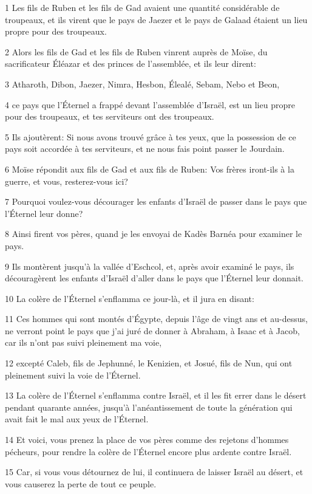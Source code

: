 \par 1 Les fils de Ruben et les fils de Gad avaient une quantité considérable de troupeaux, et ils virent que le pays de Jaezer et le pays de Galaad étaient un lieu propre pour des troupeaux.
\par 2 Alors les fils de Gad et les fils de Ruben vinrent auprès de Moïse, du sacrificateur Éléazar et des princes de l'assemblée, et ils leur dirent:
\par 3 Atharoth, Dibon, Jaezer, Nimra, Hesbon, Élealé, Sebam, Nebo et Beon,
\par 4 ce pays que l'Éternel a frappé devant l'assemblée d'Israël, est un lieu propre pour des troupeaux, et tes serviteurs ont des troupeaux.
\par 5 Ils ajoutèrent: Si nous avons trouvé grâce à tes yeux, que la possession de ce pays soit accordée à tes serviteurs, et ne nous fais point passer le Jourdain.
\par 6 Moïse répondit aux fils de Gad et aux fils de Ruben: Vos frères iront-ils à la guerre, et vous, resterez-vous ici?
\par 7 Pourquoi voulez-vous décourager les enfants d'Israël de passer dans le pays que l'Éternel leur donne?
\par 8 Ainsi firent vos pères, quand je les envoyai de Kadès Barnéa pour examiner le pays.
\par 9 Ils montèrent jusqu'à la vallée d'Eschcol, et, après avoir examiné le pays, ils découragèrent les enfants d'Israël d'aller dans le pays que l'Éternel leur donnait.
\par 10 La colère de l'Éternel s'enflamma ce jour-là, et il jura en disant:
\par 11 Ces hommes qui sont montés d'Égypte, depuis l'âge de vingt ans et au-dessus, ne verront point le pays que j'ai juré de donner à Abraham, à Isaac et à Jacob, car ils n'ont pas suivi pleinement ma voie,
\par 12 excepté Caleb, fils de Jephunné, le Kenizien, et Josué, fils de Nun, qui ont pleinement suivi la voie de l'Éternel.
\par 13 La colère de l'Éternel s'enflamma contre Israël, et il les fit errer dans le désert pendant quarante années, jusqu'à l'anéantissement de toute la génération qui avait fait le mal aux yeux de l'Éternel.
\par 14 Et voici, vous prenez la place de vos pères comme des rejetons d'hommes pécheurs, pour rendre la colère de l'Éternel encore plus ardente contre Israël.
\par 15 Car, si vous vous détournez de lui, il continuera de laisser Israël au désert, et vous causerez la perte de tout ce peuple.
